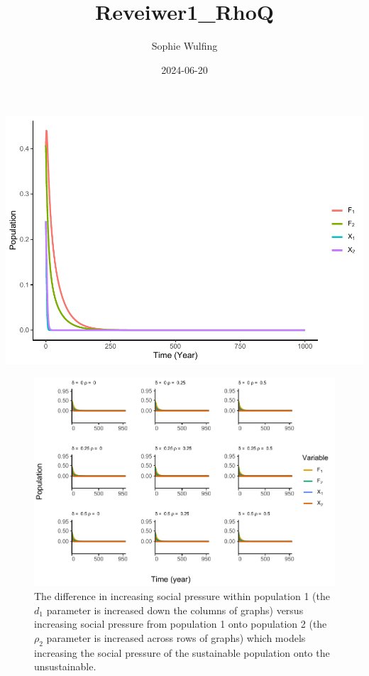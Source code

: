 \documentclass[
]{article}
\title{Reveiwer1\_RhoQ}
\author{Sophie Wulfing}
\date{2024-06-20}
\begin{document}
\maketitle

\includegraphics{ReviewerRhoTest_files/figure-latex/Bauch.Coupled-1.pdf}



\begin{figure}
\centering
\includegraphics{ReviewerRhoTest_files/figure-latex/influencerho2-1.pdf}
\caption{\label{fig:influencerho2}The difference in increasing social pressure within population 1 (the \(d_1\) parameter is increased down the columns of graphs) versus increasing social pressure from population 1 onto population 2 (the \(\rho_2\) parameter is increased across rows of graphs) which models increasing the social pressure of the sustainable population onto the unsustainable. \label{influenceRho2}}
\end{figure}
\end{document}
